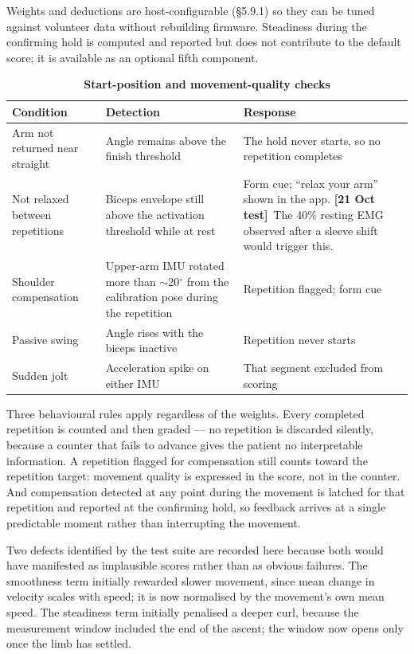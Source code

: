 \documentclass[11pt]{article}
\newcommand{\tested}{{\sffamily\scriptsize\color{good}\textbf{[21 Oct test]}}\ }
\begin{document}
\medskip
\noindent
Weights and deductions are host-configurable (\S5.9.1) so they can be tuned
against volunteer data without rebuilding firmware. Steadiness during the
confirming hold is computed and reported but does not contribute to the default
score; it is available as an optional fifth component.

\begin{table}[H]
\centering\small
\caption*{\textbf{Start-position and movement-quality checks}}
\begin{tabularx}{\linewidth}{@{}p{34mm} p{48mm} X@{}}
\toprule
\textbf{Condition} & \textbf{Detection} & \textbf{Response} \\
\midrule
Arm not returned near straight & Angle remains above the finish threshold & The hold never starts, so no repetition completes \\
Not relaxed between repetitions & Biceps envelope still above the activation threshold while at rest & Form cue; ``relax your arm'' shown in the app. \tested The 40\% resting EMG observed after a sleeve shift would trigger this. \\
Shoulder compensation & Upper-arm IMU rotated more than $\sim$20$^{\circ}$ from the calibration pose during the repetition & Repetition flagged; form cue \\
Passive swing & Angle rises with the biceps inactive & Repetition never starts \\
Sudden jolt & Acceleration spike on either IMU & That segment excluded from scoring \\
\bottomrule
\end{tabularx}
\end{table}

\noindent
Three behavioural rules apply regardless of the weights. Every completed
repetition is counted and then graded --- no repetition is discarded silently,
because a counter that fails to advance gives the patient no interpretable
information. A repetition flagged for compensation still counts toward the
repetition target: movement quality is expressed in the score, not in the
counter. And compensation detected at any point during the movement is latched
for that repetition and reported at the confirming hold, so feedback arrives at
a single predictable moment rather than interrupting the movement.

\medskip
\noindent
Two defects identified by the test suite are recorded here because both would
have manifested as implausible scores rather than as obvious failures. The
smoothness term initially rewarded slower movement, since mean change in
velocity scales with speed; it is now normalised by the movement's own mean
speed. The steadiness term initially penalised a deeper curl, because the
measurement window included the end of the ascent; the window now opens only
once the limb has settled.
\end{document}
